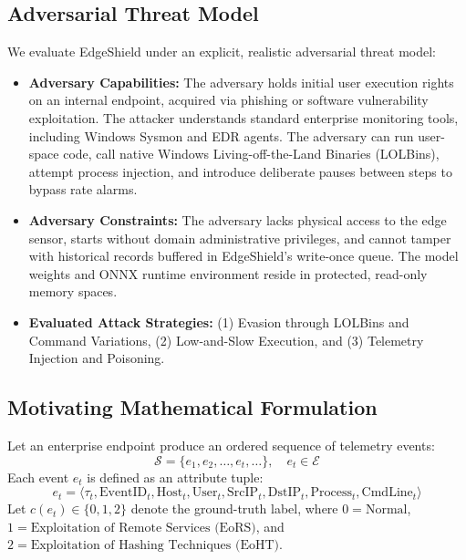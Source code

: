 \documentclass[10pt,journal,compsoc]{IEEEtran}
\begin{document}
\subsection{Adversarial Threat Model}
We evaluate EdgeShield under an explicit, realistic adversarial threat model:
\begin{itemize}
    \item \textbf{Adversary Capabilities:} The adversary holds initial user execution rights on an internal endpoint, acquired via phishing or software vulnerability exploitation. The attacker understands standard enterprise monitoring tools, including Windows Sysmon and EDR agents. The adversary can run user-space code, call native Windows Living-off-the-Land Binaries (LOLBins), attempt process injection, and introduce deliberate pauses between steps to bypass rate alarms.
    \item \textbf{Adversary Constraints:} The adversary lacks physical access to the edge sensor, starts without domain administrative privileges, and cannot tamper with historical records buffered in EdgeShield's write-once queue. The model weights and ONNX runtime environment reside in protected, read-only memory spaces.
    \item \textbf{Evaluated Attack Strategies:} (1) Evasion through LOLBins and Command Variations, (2) Low-and-Slow Execution, and (3) Telemetry Injection and Poisoning.
\end{itemize}

\subsection{Motivating Mathematical Formulation}
Let an enterprise endpoint produce an ordered sequence of telemetry events:
\begin{equation}
\mathcal{S} = \{e_1, e_2, \dots, e_t, \dots\}, \quad e_t \in \mathcal{E}
\end{equation}
Each event $e_t$ is defined as an attribute tuple:
\begin{equation}
e_t = \langle \tau_t, \text{EventID}_t, \text{Host}_t, \text{User}_t, \text{SrcIP}_t, \text{DstIP}_t, \text{Process}_t, \text{CmdLine}_t \rangle
\end{equation}
Let $c(e_t) \in \{0, 1, 2\}$ denote the ground-truth label, where $0 = \text{Normal}$, $1 = \text{Exploitation of Remote Services (EoRS)}$, and $2 = \text{Exploitation of Hashing Techniques (EoHT)}$.
\end{document}
